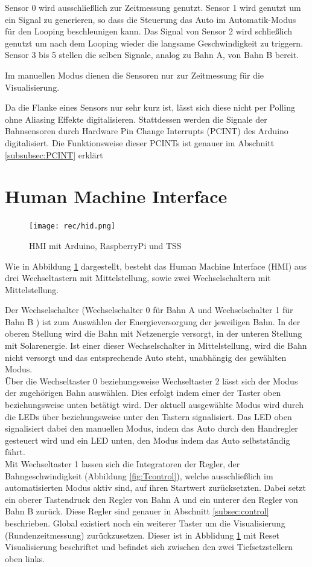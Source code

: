 \documentclass[a4paper, 11pt]{report}
\begin{document}
		Sensor 0 wird ausschließlich zur Zeitmessung genutzt.
		Sensor 1 wird genutzt um ein Signal zu generieren, so dass die Steuerung das Auto im Automatik-Modus für den Looping beschleunigen kann.
		Das Signal von Sensor 2 wird schließlich genutzt um nach dem Looping wieder die langsame Geschwindigkeit zu triggern.\\
		Sensor 3 bis 5 stellen die selben Signale, analog zu Bahn A, von Bahn B bereit.

		Im manuellen Modus dienen die Sensoren nur zur Zeitmessung für die Visualisierung.

		Da die Flanke eines Sensors nur sehr kurz ist, lässt sich diese nicht per Polling ohne Aliasing Effekte digitalisieren. Stattdessen werden die Signale der Bahnsensoren durch Hardware Pin Change Interrupts (PCINT) des Arduino digitalisiert.
		Die Funktionsweise dieser PCINTs ist genauer im Abschnitt \ref{subsubsec:PCINT} erklärt
	\section{Human Machine Interface}
		\begin{figure}[b]
			\centering
			\texttt{[image: rec/hid.png]}
			\caption{HMI mit Arduino, RaspberryPi und TSS}

			\label{img:hid}
		\end{figure}
		Wie in Abbildung \ref{img:hid} dargestellt, besteht das Human Machine Interface (HMI) aus drei Wechseltastern mit Mittelstellung, sowie zwei Wechselschaltern mit Mittelstellung.

		Der Wechselschalter (\glqq Wechselschalter 0\grqq{} für Bahn A und \glqq Wechselschalter 1\grqq{} für Bahn B ) ist zum Auswählen der Energieversorgung der jeweiligen Bahn. In der oberen Stellung wird die Bahn mit Netzenergie versorgt, in der unteren Stellung mit Solarenergie.
Ist einer dieser Wechselschalter in Mittelstellung, wird die Bahn nicht versorgt und das entsprechende Auto steht, unabhängig des gewählten Modus.\\
		Über die Wechseltaster 0 beziehungsweise Wechseltaster 2 lässt sich der Modus der zugehörigen Bahn auswählen. Dies erfolgt indem einer der Taster oben beziehungsweise unten betätigt wird.  Der aktuell ausgewählte Modus wird durch die LEDs über beziehungsweise unter den Tastern signalisiert. Das LED oben signalisiert dabei den manuellen Modus, indem das Auto durch den Handregler gesteuert wird und ein LED unten, den Modus indem das Auto selbstständig fährt.\\
Mit Wechseltaster 1  lassen sich die Integratoren der Regler, der Bahngeschwindigkeit (Abbildung \ref{fig:Tcontrol}), welche ausschließlich im automatisierten Modus aktiv sind, auf ihren Startwert zurücksetzten. Dabei setzt ein oberer Tastendruck den Regler von Bahn A und ein unterer den Regler von Bahn B zurück. Diese Regler sind genauer in Abschnitt \ref{subsec:control} beschrieben.
Global existiert noch ein weiterer Taster um die Visualisierung (Rundenzeitmessung) zurückzusetzen. Dieser ist in Abblidung \ref{img:hid} mit \glqq Reset Visualisierung\grqq{} beschriftet und befindet sich zwischen den zwei Tiefsetzstellern oben links.
\end{document}
